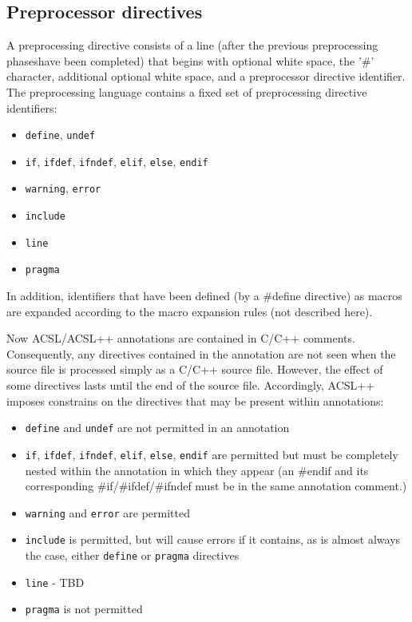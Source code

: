 \subsection{Preprocessor directives}
A preprocessing directive consists of a line (after the previous preprocessing phaseshave been completed) that begins with optional white space, the '\#' character, additional optional white space, and a preprocessor directive identifier.
The preprocessing language contains a fixed set of preprocessing directive identifiers:
\begin{itemize}
	\item \texttt{define}, \texttt{undef}
	\item \texttt{if}, \texttt{ifdef}, \texttt{ifndef}, \texttt{elif}, \texttt{else}, \texttt{endif}
	\item \texttt{warning}, \texttt{error}
	\item \texttt{include}
	\item \texttt{line}
	\item \texttt{pragma}
\end{itemize}
In addition, identifiers that have been defined (by a \#define directive) as macros are expanded according to the macro expansion rules (not described here).

Now ACSL/ACSL++ annotations are contained in C/C++ comments. 
Consequently, any directives contained in the annotation are not seen when the source file is processed simply as a C/C++ source file. However, the effect of some directives lasts until the end of the source file. 
Accordingly, ACSL++ imposes constrains on the directives that may be present within annotations:
\begin{itemize}
	\item \texttt{define} and \texttt{undef} are not permitted in an annotation
	\item \texttt{if}, \texttt{ifdef}, \texttt{ifndef}, \texttt{elif}, \texttt{else}, \texttt{endif} are permitted but must be completely nested within the annotation in which they appear (an \#endif and its corresponding \#if/\#ifdef/\#ifndef must be in the same annotation comment.)
	\item \texttt{warning} and \texttt{error} are permitted
	\item \texttt{include} is permitted, but will cause errors if it contains, as is almost always the case, either \texttt{define} or \texttt{pragma} directives
	\item \texttt{line} - TBD
	\item \texttt{pragma} is not permitted
\end{itemize}



